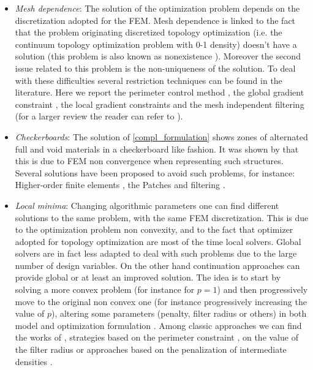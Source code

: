 \begin{itemize}
\item \textit{Mesh dependence}: The solution of the optimization problem depends on the discretization adopted for the FEM. Mesh dependence is linked to the fact that the problem originating discretized  topology optimization (i.e. the continuum topology optimization problem with 0-1 density) doesn't have a solution (this problem is also known as nonexistence \cite{sigmund1998numerical}). Moreover the second issue related to this problem is the non-uniqueness of the solution. To deal with these difficulties several restriction techniques can be found in the literature. Here we report the perimeter control method \cite{ambrosio1993optimal,haber1996new}, the global gradient constraint \cite{bendsoe1995optimization}, the local gradient constraints \cite{niordson1983optimal} and the mesh independent filtering \cite{sigmund1994design,sigmund1997design} (for a larger review the reader can refer to \cite{sigmund2007morphology}).
\item \textit{Checkerboards}: The solution of \ref{compl_formulation} shows zones of alternated full and void materials in a checkerboard like fashion. It was shown by \cite{jog1996stability}  that this is due to FEM non convergence when representing such structures.
Several solutions have been proposed to avoid such problems, for instance:
Higher-order finite elements \cite{diaz1995checkerboard,jog1996stability}, the Patches \cite{bendsoe1993topology} and filtering \cite{sigmund1994design}. 
\item \textit{Local minima}: Changing algorithmic parameters one can find different solutions to the same problem, with the same FEM discretization. This is due to the optimization problem non convexity, and to the fact that optimizer adopted for topology optimization are most of the time local solvers. Global solvers are in fact less adapted to deal with such problems due to the large number of design variables. On the other hand continuation approaches can provide global or at least an improved solution. The idea is to start by solving a more convex problem (for instance for $p=1$) and then progressively move to the original non convex one (for instance progressively increasing the value of $p$), altering some parameters (penalty, filter radius or others) in both model and optimization formulation . Among classic approaches we can find the works of
\cite{allaire1993numerical,allaire1993topology}, strategies based on the perimeter constraint \cite{haber1996new}, on the value of the filter radius \cite{sigmund1997design,sigmund1997designb} or approaches based on the penalization of intermediate densities \cite{guedes1997prediction} .
\end{itemize}
